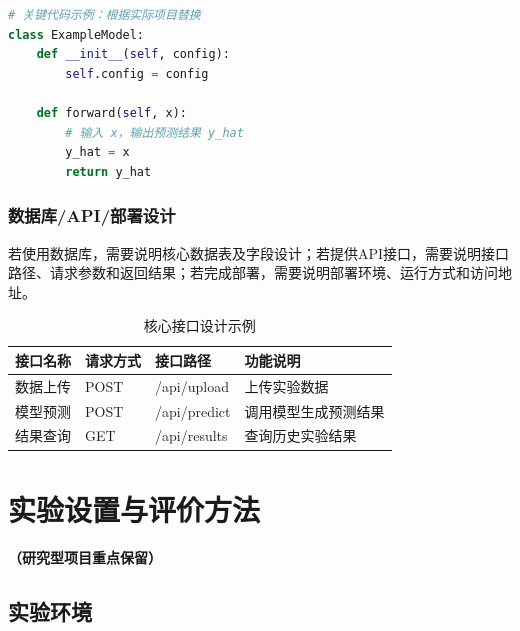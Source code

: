 \documentclass{style/course-report}
\begin{document}

\begin{lstlisting}[language=Python]
# 关键代码示例：根据实际项目替换
class ExampleModel:
    def __init__(self, config):
        self.config = config

    def forward(self, x):
        # 输入 x，输出预测结果 y_hat
        y_hat = x
        return y_hat
\end{lstlisting}

\subsubsection{数据库/API/部署设计}

若使用数据库，需要说明核心数据表及字段设计；若提供API接口，需要说明接口路径、请求参数和返回结果；若完成部署，需要说明部署环境、运行方式和访问地址。

\begin{table}[H]
    \centering
    \caption{核心接口设计示例}
    \begin{tabular}{llll}
        \toprule
        接口名称 & 请求方式 & 接口路径 & 功能说明 \\
        \midrule
        数据上传 & POST & /api/upload & 上传实验数据 \\
        模型预测 & POST & /api/predict & 调用模型生成预测结果 \\
        结果查询 & GET & /api/results & 查询历史实验结果 \\
        \bottomrule
    \end{tabular}
    \label{tab:api}
\end{table}




\section{实验设置与评价方法}

\textbf{（研究型项目重点保留）}

\subsection{实验环境}
\end{document}
